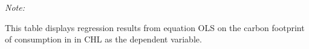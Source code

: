 \begin{table}[htbp!]
\begin{adjustbox}{width = 1\textwidth, max height = 0.95\textheight, center}
\begin{threeparttable}[b]
         \begin{tablenotes}\item \medskip \textit{Note:}
            \item This table displays regression results from equation OLS on the carbon footprint of consumption in  in CHL as the dependent variable.  
         \end{tablenotes}
      \end{threeparttable}
   \end{adjustbox}
\end{table}


